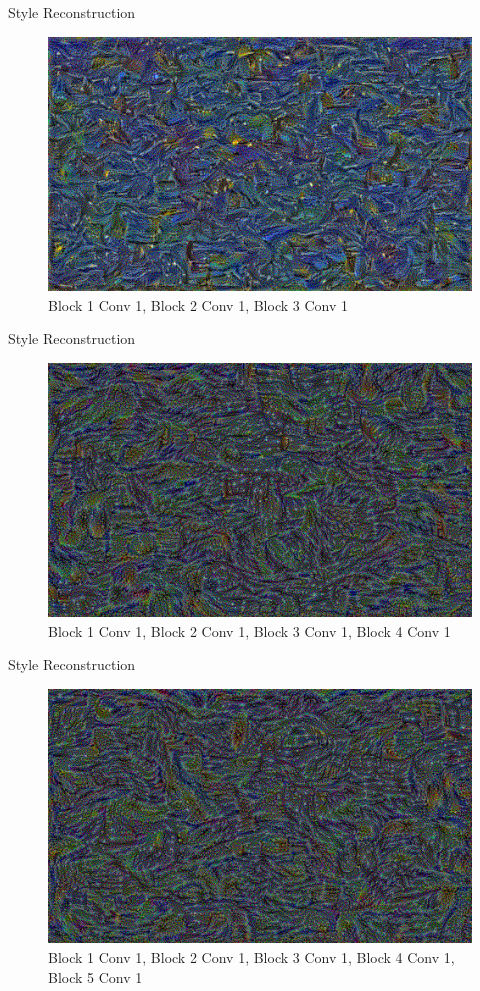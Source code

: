 \documentclass{beamer}
\begin{document}
\begin{frame}{Style Reconstruction}
\begin{figure}[ht]
\centering
\caption{Block 1 Conv 1, Block 2 Conv 1, Block 3 Conv 1}
\includegraphics[width=\textwidth]{img/style/block3_conv1.png}
\end{figure}
\end{frame}

\begin{frame}{Style Reconstruction}
\begin{figure}[ht]
\centering
\caption{Block 1 Conv 1, Block 2 Conv 1, Block 3 Conv 1, Block 4 Conv 1}
\includegraphics[width=\textwidth]{img/style/block4_conv1.png}
\end{figure}
\end{frame}

\begin{frame}{Style Reconstruction}
\begin{figure}[ht]
\centering
\caption{Block 1 Conv 1, Block 2 Conv 1, Block 3 Conv 1, Block 4 Conv 1, Block 5 Conv 1}
\includegraphics[width=\textwidth]{img/style/block5_conv1.png}
\end{figure}
\end{frame}
\end{document}
